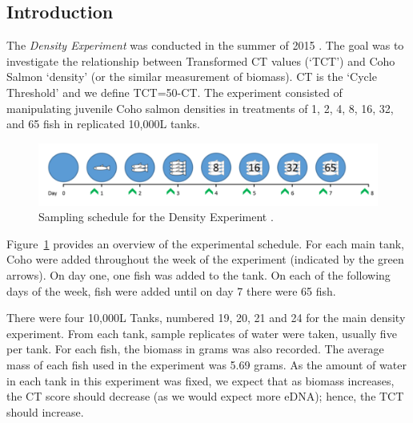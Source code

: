 \label{chapter:newsol}

\subsection{Introduction}

 The \textit{Density Experiment} was conducted in the summer of 2015 \citep{fishforensics,hatchery}. The goal was to investigate the relationship between Transformed CT values (`TCT') and Coho Salmon `density’ (or the similar measurement of biomass). CT is the `Cycle Threshold' and we define TCT=50-CT.  The experiment consisted of manipulating juvenile Coho salmon densities in treatments of 1, 2, 4, 8, 16, 32, and 65 fish in replicated 10,000L tanks.


\begin{figure}[H]
\includegraphics[scale=0.6]{Chapter3Images/samplingscheduleday.png}
\caption{ Sampling schedule for the Density Experiment \citep{berg}.}
\label{fig:densityschedule1}
\end{figure}

Figure~\ref{fig:densityschedule1}  \citep{fishforensics} provides an overview of the experimental schedule. For each main tank, Coho were added throughout the week of the experiment (indicated by the green arrows). On day one, one fish was added to the tank. On each of the following days of the week, fish were added until on day 7 there were 65 fish.

\vspace{3mm}

There were four 10,000L Tanks, numbered 19, 20, 21 and 24 for the main density experiment. From each tank, sample replicates of water were taken, usually five per tank.
For each fish, the biomass in grams was also recorded. The average mass of each fish used in the experiment was 5.69 grams. As the amount of water in each tank in this experiment was fixed, we expect that as biomass increases, the CT score should decrease (as we would expect more eDNA);  hence, the TCT should increase.

